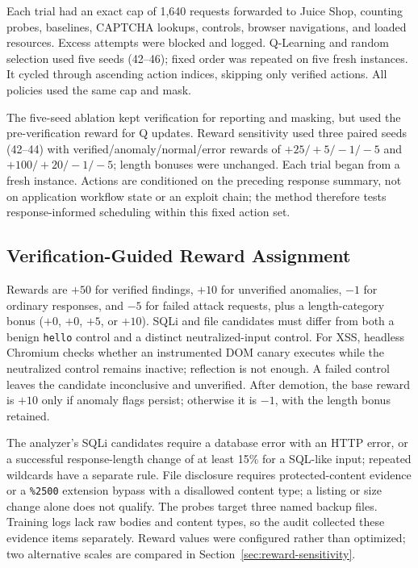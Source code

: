 \documentclass[conference, a4paper]{IEEEtran}
\begin{document}
Each trial had an exact cap of 1,640 requests forwarded to Juice Shop,
counting probes, baselines, CAPTCHA lookups, controls, browser
navigations, and loaded resources. Excess attempts were blocked and
logged. Q-Learning and random selection used five seeds (42--46);
fixed order was repeated on five fresh instances. It cycled through
ascending action indices, skipping only verified actions. All policies
used the same cap and mask.

The five-seed ablation kept verification for reporting and masking,
but used the pre-verification reward for Q updates. Reward sensitivity
used three paired seeds (42--44) with verified/anomaly/normal/error
rewards of $+25/+5/-1/-5$ and $+100/+20/-1/-5$; length bonuses were
unchanged. Each trial began from a fresh instance. Actions are
conditioned on the preceding response summary, not on application
workflow state or an exploit chain; the method therefore tests
response-informed scheduling within this fixed action set.

\subsection{Verification-Guided Reward Assignment}

Rewards are $+50$ for verified findings, $+10$ for unverified
anomalies, $-1$ for ordinary responses, and $-5$ for failed attack
requests, plus a length-category bonus ($+0$, $+0$, $+5$, or $+10$).
SQLi and file candidates must differ from both a benign \texttt{hello}
control and a distinct neutralized-input control. For XSS, headless
Chromium checks whether an instrumented DOM canary executes while the
neutralized control remains inactive; reflection is not enough. A
failed control leaves the candidate inconclusive and unverified.
After demotion, the base reward is $+10$ only if anomaly flags persist;
otherwise it is $-1$, with the length bonus retained.

The analyzer's SQLi candidates require a database error with an HTTP
error, or a successful response-length change of at least 15\% for a
SQL-like input; repeated wildcards have a separate rule. File disclosure
requires protected-content evidence or a \texttt{\%2500} extension
bypass with a disallowed content type; a listing or size change alone
does not qualify. The probes target three named backup files. Training
logs lack raw bodies and content types, so the audit collected these
evidence items separately. Reward values were configured rather than
optimized; two alternative scales are compared in
Section~\ref{sec:reward-sensitivity}.
\end{document}
